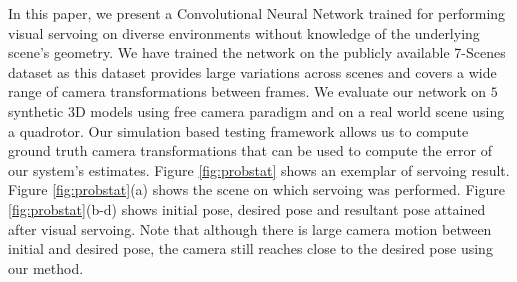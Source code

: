 \documentclass[usletter, 10 pt, conference]{ieeeconf}  %
\begin{document}
\indent In this paper, we present a Convolutional Neural Network trained for performing visual servoing on diverse environments without knowledge of the underlying scene's geometry. We have trained the network on the publicly available 7-Scenes dataset \cite{glocker2013real} as this dataset provides large variations across scenes and covers a  wide range of camera transformations between frames. We evaluate our network on $5$ synthetic $3$D models using free camera paradigm and on a real world scene using a quadrotor. Our simulation based testing framework allows us to compute ground truth camera transformations that can be used to compute the error of our system's estimates. Figure \ref{fig:probstat} shows an exemplar of servoing result.  Figure \ref{fig:probstat}(a) shows the scene on which servoing was performed. Figure \ref{fig:probstat}(b-d) shows initial pose, desired pose and resultant pose attained after visual servoing. Note that although there is large camera motion between initial and desired pose, the camera still reaches close to the desired pose using our method. 
\end{document}
